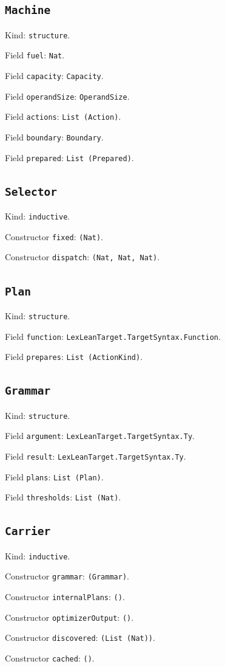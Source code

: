 \documentclass[11pt]{article}
\begin{document}
\subsection*{\texttt{Machine}}
\noindent Kind: \texttt{structure}.\par
\noindent Field \texttt{fuel}: \texttt{Nat}.\par
\noindent Field \texttt{capacity}: \texttt{Capacity}.\par
\noindent Field \texttt{operandSize}: \texttt{OperandSize}.\par
\noindent Field \texttt{actions}: \texttt{List (Action)}.\par
\noindent Field \texttt{boundary}: \texttt{Boundary}.\par
\noindent Field \texttt{prepared}: \texttt{List (Prepared)}.\par
\subsection*{\texttt{Selector}}
\noindent Kind: \texttt{inductive}.\par
\noindent Constructor \texttt{fixed}: \texttt{(Nat)}.\par
\noindent Constructor \texttt{dispatch}: \texttt{(Nat, Nat, Nat)}.\par
\subsection*{\texttt{Plan}}
\noindent Kind: \texttt{structure}.\par
\noindent Field \texttt{function}: \texttt{LexLeanTarget.TargetSyntax.Function}.\par
\noindent Field \texttt{prepares}: \texttt{List (ActionKind)}.\par
\subsection*{\texttt{Grammar}}
\noindent Kind: \texttt{structure}.\par
\noindent Field \texttt{argument}: \texttt{LexLeanTarget.TargetSyntax.Ty}.\par
\noindent Field \texttt{result}: \texttt{LexLeanTarget.TargetSyntax.Ty}.\par
\noindent Field \texttt{plans}: \texttt{List (Plan)}.\par
\noindent Field \texttt{thresholds}: \texttt{List (Nat)}.\par
\subsection*{\texttt{Carrier}}
\noindent Kind: \texttt{inductive}.\par
\noindent Constructor \texttt{grammar}: \texttt{(Grammar)}.\par
\noindent Constructor \texttt{internalPlans}: \texttt{()}.\par
\noindent Constructor \texttt{optimizerOutput}: \texttt{()}.\par
\noindent Constructor \texttt{discovered}: \texttt{(List (Nat))}.\par
\noindent Constructor \texttt{cached}: \texttt{()}.\par
\end{document}
